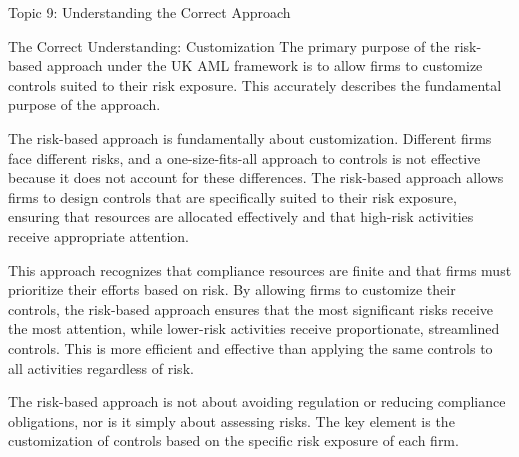 \documentclass[5pt]{beamer}
\begin{document}
	\begin{frame}{Topic 9: Understanding the Correct Approach}
		\begin{block}{\tiny The Correct Understanding: Customization}
			\tiny The primary purpose of the risk-based approach under the UK AML framework is to allow firms to customize controls suited to their risk exposure. This accurately describes the fundamental purpose of the approach.
			
			The risk-based approach is fundamentally about customization. Different firms face different risks, and a one-size-fits-all approach to controls is not effective because it does not account for these differences. The risk-based approach allows firms to design controls that are specifically suited to their risk exposure, ensuring that resources are allocated effectively and that high-risk activities receive appropriate attention.
			
			This approach recognizes that compliance resources are finite and that firms must prioritize their efforts based on risk. By allowing firms to customize their controls, the risk-based approach ensures that the most significant risks receive the most attention, while lower-risk activities receive proportionate, streamlined controls. This is more efficient and effective than applying the same controls to all activities regardless of risk.
			
			The risk-based approach is not about avoiding regulation or reducing compliance obligations, nor is it simply about assessing risks. The key element is the customization of controls based on the specific risk exposure of each firm.
		\end{block}
	\end{frame}
	
\end{document}
